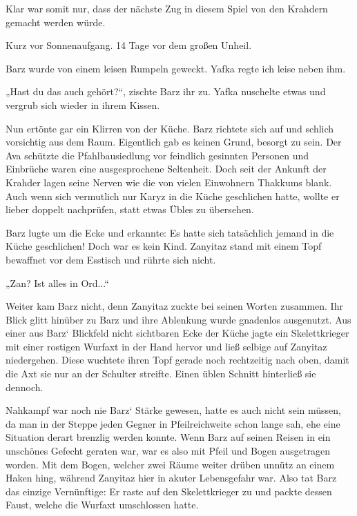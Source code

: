 Klar war somit nur, dass der nächste Zug in diesem Spiel von den Krahdern gemacht werden würde.\bigskip







Kurz vor Sonnenaufgang. 14 Tage vor dem großen Unheil.\bigskip



Barz wurde von einem leisen Rumpeln geweckt. Yafka regte ich leise neben ihm.

„Hast du das auch gehört?“, zischte Barz ihr zu. Yafka nuschelte etwas und vergrub sich wieder in ihrem Kissen.

Nun ertönte gar ein Klirren von der Küche. Barz richtete sich auf und schlich vorsichtig aus dem Raum. Eigentlich gab es keinen Grund, besorgt zu sein. Der Ava schützte die Pfahlbausiedlung vor feindlich gesinnten Personen und Einbrüche waren eine ausgesprochene Seltenheit. Doch seit der Ankunft der Krahder lagen seine Nerven wie die von vielen Einwohnern Thakkums blank. Auch wenn sich vermutlich nur Karyz in die Küche geschlichen hatte, wollte er lieber doppelt nachprüfen, statt etwas Übles zu übersehen.

Barz lugte um die Ecke und erkannte: Es hatte sich tatsächlich jemand in die Küche geschlichen! Doch war es kein Kind. Zanyitaz stand mit einem Topf bewaffnet vor dem Esstisch und rührte sich nicht.

„Zan? Ist alles in Ord...“

Weiter kam Barz nicht, denn Zanyitaz zuckte bei seinen Worten zusammen. Ihr Blick glitt hinüber zu Barz und ihre Ablenkung wurde gnadenlos ausgenutzt. Aus einer aus Barz‘ Blickfeld nicht sichtbaren Ecke der Küche jagte ein Skelettkrieger mit einer rostigen Wurfaxt in der Hand hervor und ließ selbige auf Zanyitaz niedergehen. Diese wuchtete ihren Topf gerade noch rechtzeitig nach oben, damit die Axt sie nur an der Schulter streifte. Einen üblen Schnitt hinterließ sie dennoch.

Nahkampf war noch nie Barz‘ Stärke gewesen, hatte es auch nicht sein müssen, da man in der Steppe jeden Gegner in Pfeilreichweite schon lange sah, ehe eine Situation derart brenzlig werden konnte. Wenn Barz auf seinen Reisen in ein unschönes Gefecht geraten war, war es also mit Pfeil und Bogen ausgetragen worden. Mit dem Bogen, welcher zwei Räume weiter drüben unnütz an einem Haken hing, während Zanyitaz hier in akuter Lebensgefahr war. Also tat Barz das einzige Vernünftige: Er raste auf den Skelettkrieger zu und packte dessen Faust, welche die Wurfaxt umschlossen hatte.


